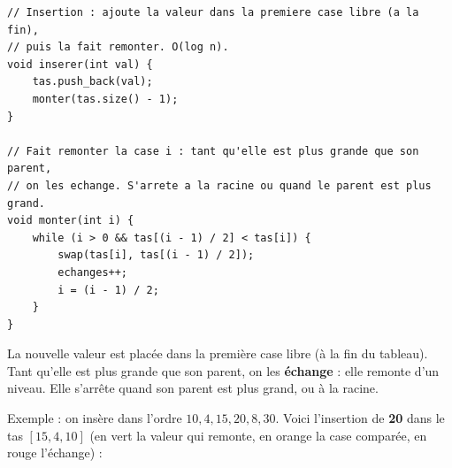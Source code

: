 \documentclass[11pt,a4paper]{article}
\begin{document}
\begin{lstlisting}[caption={Insertion (\texttt{inserer} et \texttt{monter}).}]
// Insertion : ajoute la valeur dans la premiere case libre (a la fin),
// puis la fait remonter. O(log n).
void inserer(int val) {
    tas.push_back(val);
    monter(tas.size() - 1);
}

// Fait remonter la case i : tant qu'elle est plus grande que son parent,
// on les echange. S'arrete a la racine ou quand le parent est plus grand.
void monter(int i) {
    while (i > 0 && tas[(i - 1) / 2] < tas[i]) {
        swap(tas[i], tas[(i - 1) / 2]);
        echanges++;
        i = (i - 1) / 2;
    }
}
\end{lstlisting}

La nouvelle valeur est placée dans la première case libre (à la fin du tableau). Tant
qu'elle est plus grande que son parent, on les \textbf{échange} : elle remonte d'un
niveau. Elle s'arrête quand son parent est plus grand, ou à la racine.

Exemple : on insère dans l'ordre $10, 4, 15, 20, 8, 30$. Voici l'insertion de \textbf{20}
dans le tas $[15, 4, 10]$ (en vert la valeur qui remonte, en orange la case comparée, en
rouge l'échange) :
\end{document}
